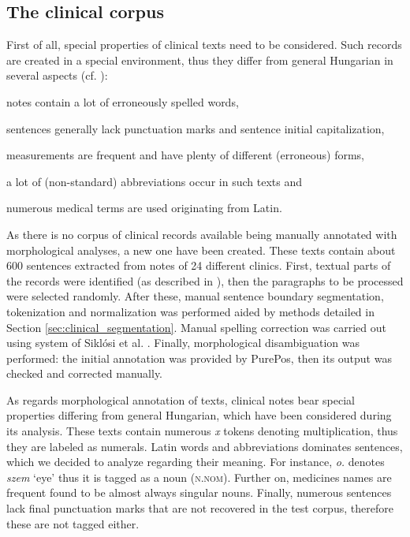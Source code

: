 \subsection{The clinical corpus}

First of all, special properties of clinical texts need to be considered. 
Such records are created in a special environment, thus they differ from general Hungarian in several aspects (cf. \cite{Orosz2013a,Siklosi2013b,Siklosi2012}):
\begin{inparaenum}
 \item notes contain a lot of erroneously spelled words,
 \item sentences generally lack punctuation marks and sentence initial capitalization, 
 \item measurements are frequent and have plenty of different (erroneous) forms,
 \item a lot of (non-standard) abbreviations occur in such texts and
 \item numerous medical terms are used originating from Latin.
\end{inparaenum}

As there is no corpus of clinical records available being manually annotated with morphological analyses, a new one have been created. 
These texts contain about 600 sentences extracted from notes of 24 different clinics. 
First, textual parts of the records were identified (as described in \cite{Siklosi2012}), then the paragraphs to be processed were selected randomly. 
After these, manual sentence boundary segmentation, tokenization and normalization was performed aided by methods detailed in Section \ref{sec:clinical_segmentation}. 
Manual spelling correction was carried out using system of Siklósi et al. \cite{Siklosi2013}. 
Finally, morphological disambiguation was performed: the initial annotation was provided by PurePos, then its output was checked and corrected manually. 

As regards morphological annotation of texts, clinical notes bear special properties differing from general Hungarian, which have been considered during its analysis. 
These texts contain numerous \textit{x} tokens denoting multiplication, thus they are labeled as numerals. 
Latin words and abbreviations dominates sentences, which we decided to analyze regarding their meaning. 
For instance, \textit{o.} denotes \textit{szem} `eye’ thus it is tagged as a noun (\textsc{n.nom}). 
Further on, medicines names are frequent found to be almost always singular nouns. 
Finally, numerous sentences lack final punctuation marks that are not recovered in the test corpus, therefore these are not tagged either. 

